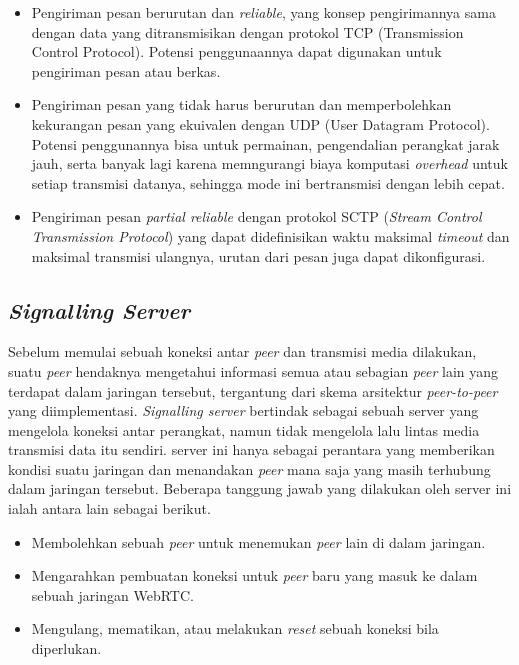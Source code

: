 \begin{itemize}[noitemsep]
    \item Pengiriman pesan berurutan dan \textit{reliable}, yang konsep pengirimannya sama dengan data yang ditransmisikan dengan protokol TCP (Transmission Control Protocol). Potensi penggunaannya dapat digunakan untuk pengiriman pesan atau berkas.
    \item Pengiriman pesan yang tidak harus berurutan dan memperbolehkan kekurangan pesan yang ekuivalen dengan UDP (User Datagram Protocol). Potensi penggunannya bisa untuk permainan, pengendalian perangkat jarak jauh, serta banyak lagi karena memngurangi biaya komputasi \textit{overhead} untuk setiap transmisi datanya, sehingga mode ini bertransmisi dengan lebih cepat.
    \item Pengiriman pesan \textit{partial reliable} dengan protokol SCTP (\textit{Stream Control Transmission Protocol}) yang dapat didefinisikan waktu maksimal \textit{timeout} dan maksimal transmisi ulangnya, urutan dari pesan juga dapat dikonfigurasi.
\end{itemize}

\subsection{\textit{Signalling Server}}

Sebelum memulai sebuah koneksi antar \textit{peer} dan transmisi media dilakukan, suatu \textit{peer} hendaknya mengetahui informasi semua atau sebagian \textit{peer} lain yang terdapat dalam jaringan tersebut, tergantung dari skema arsitektur \textit{peer-to-peer} yang diimplementasi. \textit{Signalling server} bertindak sebagai sebuah server yang mengelola koneksi antar perangkat, namun tidak mengelola lalu lintas media transmisi data itu sendiri. server ini hanya sebagai perantara yang memberikan kondisi suatu jaringan dan menandakan \textit{peer} mana saja yang masih terhubung dalam jaringan tersebut. Beberapa tanggung jawab yang dilakukan oleh server ini ialah antara lain sebagai berikut.
 
\begin{itemize}[noitemsep]
    \item Membolehkan sebuah \textit{peer} untuk menemukan \textit{peer} lain di dalam jaringan.
    \item Mengarahkan pembuatan koneksi untuk \textit{peer} baru yang masuk ke dalam sebuah jaringan WebRTC.
    \item Mengulang, mematikan, atau melakukan \textit{reset} sebuah koneksi bila diperlukan.
\end{itemize}

